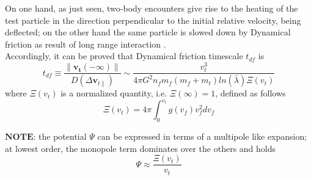 On one hand, as just seen, two-body encounters give rise to the heating of the test particle in the direction perpendicular to the initial relative velocity, being deflected; on the other hand the same particle is slowed down by Dynamical friction as result of long range interaction \cite{Baumgardt_2006}.\\Accordingly, it can be proved that Dynamical friction timescale $t_{df}$ is
\begin{equation}\label{t_df formula}
    t_{df}\equiv\frac{\|\mathbf{v_t}(-\infty)\|}{D(\Delta\mathbf{v}_{t\parallel})}\sim \frac{v_t^3}{4\pi G^2n_fm_f(m_f+m_t)ln(\bar{\lambda})\Xi(v_t)}
\end{equation}
where $\Xi(v_t)$ is a normalized quantity, i.e. $\Xi(\infty)=1$, defined as follows
\begin{equation}
    \Xi(v_t)=4\pi\int_0^{v_t}g(v_f)v_f^2dv_f
\end{equation}

$\mathbf{NOTE}$: the potential $\Psi$ can be expressed in terms of a multipole like expansion; at lowest order, the monopole term dominates over the others and holds
\begin{equation}
    \Psi\approx\frac{\Xi(v_t)}{v_t}
\end{equation}




